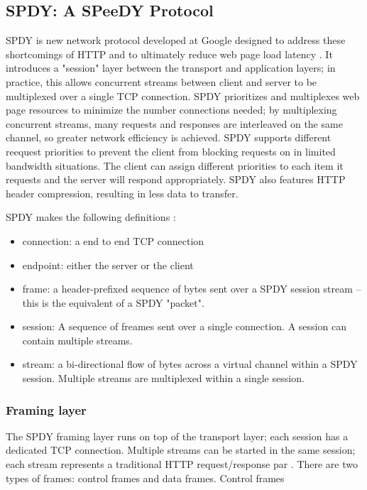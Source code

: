 \documentclass{article}
\begin{document}
\subsection{SPDY: A SPeeDY Protocol}

SPDY is new network protocol developed at Google designed to address these shortcomings of HTTP and to ultimately reduce web page load latency \cite{spdy}. It introduces a "session" layer between the transport and application layers; in practice, this allows concurrent streams between client and server to be multiplexed over a single TCP connection.  SPDY prioritizes and multiplexes web page resources to minimize the number connections needed; by multiplexing concurrent streams, many
requests and responses are interleaved on the same channel, so greater network efficiency is achieved. SPDY supports different reequest priorities to prevent the client from
blocking requests on in limited bandwidth situations. The client can assign different priorities to each item it requests and the server will respond appropriately.  SPDY also features HTTP header compression, resulting in less data to transfer.

SPDY makes the following definitions \cite{spdy2}:
  \begin{itemize}
    \item connection: a end to end TCP connection
    \item endpoint: either the server or the client
    \item frame: a header-prefixed sequence of bytes sent over a SPDY session stream -- this is the equivalent of a SPDY "packet".
    \item session: A sequence of freames sent over a single connection. A session can contain multiple streams.
    \item stream: a bi-directional flow of bytes across a virtual channel within a SPDY session. Multiple streams are multiplexed within a single session.
  \end{itemize}

\subsubsection{Framing layer}
The SPDY framing layer runs on top of the transport layer; each session has a dedicated TCP connection. Multiple streams can be started in the same session; each stream represents a traditional HTTP request/response par \cite{spdy2}. There are two types of frames: control frames and data frames. Control frames 
\end{document}
